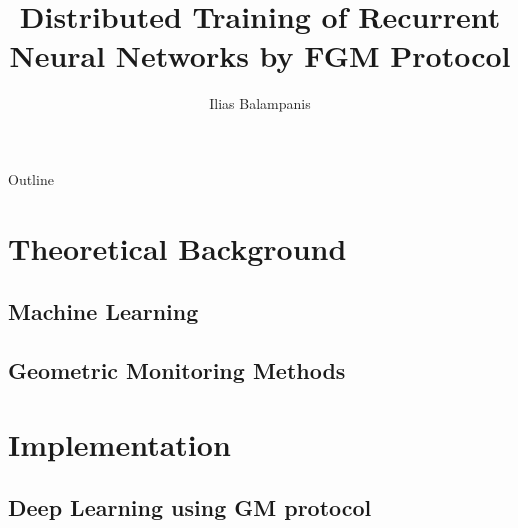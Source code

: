 \documentclass{beamer}
\title[Diploma Thesis Presentation]{Distributed Training of Recurrent Neural Networks by FGM Protocol}
\author{Ilias Balampanis}
\institute[TUC]{ %
School of Electrical and Computer Engineering \\
Technical University of Crete}
\begin{document}
    \begin{frame}
        \titlepage
    \end{frame}

    \begin{frame}{Outline}
        \tableofcontents
    \end{frame}




    \section{Theoretical Background}\label{sec:theoretical-background}

    \subsection{Machine Learning}\label{subsec:machine-learning}

    \subsection{Geometric Monitoring Methods}\label{subsec:geometric-monitoring-methods}




    \section{Implementation}\label{sec:implementation}

    \subsection{Deep Learning using GM protocol}\label{subsec:deep-learning-using-gm-protocol}
\end{document}
